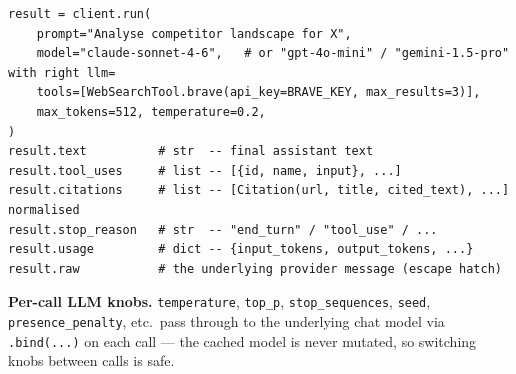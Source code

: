\documentclass[10pt,a4paper]{article}
\begin{document}
\begin{lstlisting}
result = client.run(
    prompt="Analyse competitor landscape for X",
    model="claude-sonnet-4-6",   # or "gpt-4o-mini" / "gemini-1.5-pro" with right llm=
    tools=[WebSearchTool.brave(api_key=BRAVE_KEY, max_results=3)],
    max_tokens=512, temperature=0.2,
)
result.text          # str  -- final assistant text
result.tool_uses     # list -- [{id, name, input}, ...]
result.citations     # list -- [Citation(url, title, cited_text), ...] normalised
result.stop_reason   # str  -- "end_turn" / "tool_use" / ...
result.usage         # dict -- {input_tokens, output_tokens, ...}
result.raw           # the underlying provider message (escape hatch)
\end{lstlisting}

\noindent\textbf{Per-call LLM knobs.} \texttt{temperature}, \texttt{top\_p}, \texttt{stop\_sequences}, \texttt{seed}, \texttt{presence\_penalty}, etc.\ pass through to the underlying chat model via \texttt{.bind(...)} on each call --- the cached model is never mutated, so switching knobs between calls is safe.
\end{document}
